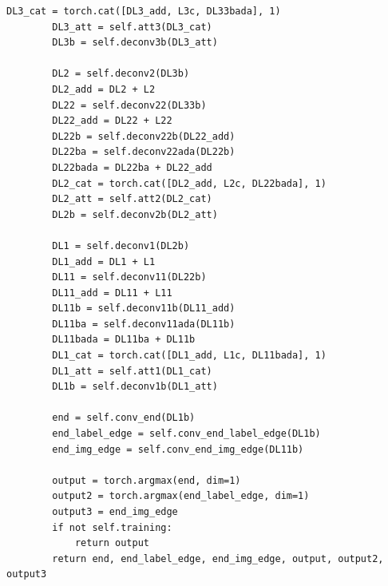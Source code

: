 \begin{lstlisting}[caption= Продолжение листинга A.1]
        DL3_cat = torch.cat([DL3_add, L3c, DL33bada], 1)
        DL3_att = self.att3(DL3_cat)
        DL3b = self.deconv3b(DL3_att)

        DL2 = self.deconv2(DL3b)
        DL2_add = DL2 + L2
        DL22 = self.deconv22(DL33b)
        DL22_add = DL22 + L22
        DL22b = self.deconv22b(DL22_add)
        DL22ba = self.deconv22ada(DL22b)
        DL22bada = DL22ba + DL22_add
        DL2_cat = torch.cat([DL2_add, L2c, DL22bada], 1)
        DL2_att = self.att2(DL2_cat)
        DL2b = self.deconv2b(DL2_att)

        DL1 = self.deconv1(DL2b)
        DL1_add = DL1 + L1
        DL11 = self.deconv11(DL22b)
        DL11_add = DL11 + L11
        DL11b = self.deconv11b(DL11_add)
        DL11ba = self.deconv11ada(DL11b)
        DL11bada = DL11ba + DL11b
        DL1_cat = torch.cat([DL1_add, L1c, DL11bada], 1)
        DL1_att = self.att1(DL1_cat)
        DL1b = self.deconv1b(DL1_att)

        end = self.conv_end(DL1b)
        end_label_edge = self.conv_end_label_edge(DL1b)
        end_img_edge = self.conv_end_img_edge(DL11b)

        output = torch.argmax(end, dim=1)
        output2 = torch.argmax(end_label_edge, dim=1)
        output3 = end_img_edge
        if not self.training: 
            return output
        return end, end_label_edge, end_img_edge, output, output2, output3  
\end{lstlisting}